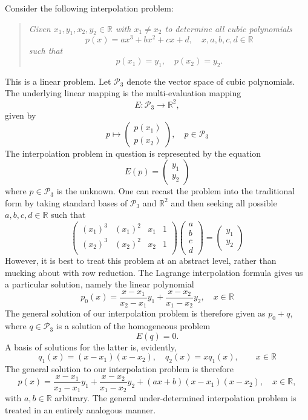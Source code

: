 \documentclass[12pt]{article}
\newcommand{\cP}{\mathcal{P}}
\newcommand{\reals}{\mathbb{R}}
\newcommand{\lp}{\left(}
\newcommand{\rp}{\right)}
\begin{document}
Consider the following
interpolation problem:
\begin{quote}
  \em
  Given $x_1,y_1,x_2,y_2\in \reals$ with $x_1\neq x_2$ to determine
  all cubic polynomials
  $$p(x)= ax^3+bx^2+cx+d,\quad x,a,b,c,d\in \reals$$
  such that 
  $$p(x_1) = y_1,\quad p(x_2) = y_2.$$  
\end{quote}
This is a linear problem.  Let $\cP_3$ denote the vector space of
cubic polynomials. The underlying linear mapping is the
multi-evaluation mapping
$$E:\cP_3\rightarrow\reals^2,$$
given by
$$ p\mapsto 
\begin{pmatrix}
  p(x_1)\\ p(x_2)
\end{pmatrix},\quad p\in \cP_3
$$
The interpolation problem in question is represented by the equation
$$E(p) = 
\begin{pmatrix}
  y_1 \\ y_2
\end{pmatrix}
$$
where $p\in \cP_3$ is the unknown.  One can recast the problem into the
traditional form by taking standard bases of  $\cP_3$ and $\reals^2$ and
then seeking all possible $a,b,c,d\in\reals$ such that
$$
\begin{pmatrix}
   \lp x_1\rp^3 &    \lp x_1\rp^2 & x_1 & 1 \\
   \lp x_2\rp^3 &    \lp x_2\rp^2 & x_2 & 1 \\
\end{pmatrix}
\begin{pmatrix}
  a\\b\\c\\d
\end{pmatrix} 
=
\begin{pmatrix}
  y_1 \\ y_2
\end{pmatrix}
$$
However, it is best to treat this problem at an abstract level,
rather than mucking about with row reduction.  The Lagrange
interpolation formula gives us a particular solution, namely the linear
polynomial 
$$p_0(x) = \frac{x-x_1}{x_2-x_1}y_1 + \frac{x-x_2}{x_1-x_2} y_2,\quad
x\in \reals$$
The general solution of our interpolation problem is therefore given
as
$p_0 + q$, where $q\in \cP_3$ is a solution of the homogeneous
problem
$$E(q)=0.$$
A basis of solutions for the latter is, evidently, 
$$q_1(x) = (x-x_1)(x-x_2),\quad q_2(x) = x q_1(x),\qquad x\in \reals$$
The general solution to our interpolation problem is therefore
$$p(x) =  \frac{x-x_1}{x_2-x_1}y_1 + \frac{x-x_2}{x_1-x_2} y_2 +
(ax+b)(x-x_1)(x-x_2),\quad x\in\reals,$$
with $a,b\in \reals$ arbitrary.  The general under-determined
interpolation problem is treated in an entirely analogous manner.
\end{document}

